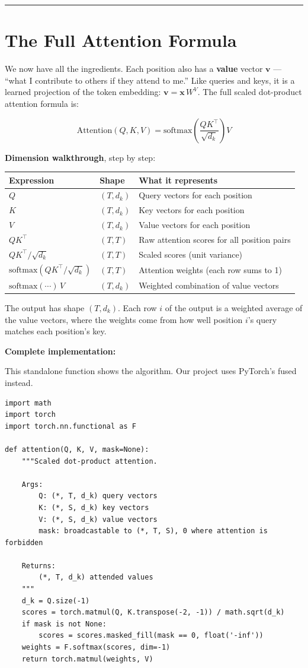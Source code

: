 \bigskip\hrule\bigskip

\section{The Full Attention Formula}

We now have all the ingredients. Each position also has a \textbf{value} vector $\mathbf{v}$ --- ``what I contribute to others if they attend to me.'' Like queries and keys, it is a learned projection of the token embedding: $\mathbf{v} = \mathbf{x}\, W^V$. The full scaled dot-product attention formula is:

\[
\mathrm{Attention}(Q, K, V) = \mathrm{softmax}\!\left(\frac{QK^\top}{\sqrt{d_k}}\right) V
\]

\textbf{Dimension walkthrough}, step by step:

\begin{tabular}{lll}
\toprule
Expression & Shape & What it represents \\
\midrule
$Q$ & $(T, d_k)$ & Query vectors for each position \\
$K$ & $(T, d_k)$ & Key vectors for each position \\
$V$ & $(T, d_k)$ & Value vectors for each position \\
$QK^\top$ & $(T, T)$ & Raw attention scores for all position pairs \\
$QK^\top / \sqrt{d_k}$ & $(T, T)$ & Scaled scores (unit variance) \\
$\mathrm{softmax}(QK^\top / \sqrt{d_k})$ & $(T, T)$ & Attention weights (each row sums to 1) \\
$\mathrm{softmax}(\cdots)\, V$ & $(T, d_k)$ & Weighted combination of value vectors \\
\bottomrule
\end{tabular}

The output has shape $(T, d_k)$. Each row $i$ of the output is a weighted average of the value vectors, where the weights come from how well position $i$'s query matches each position's key.

\textbf{Complete implementation:}

This standalone function shows the algorithm. Our project uses PyTorch's fused  instead.

\demotag
\begin{lstlisting}
import math
import torch
import torch.nn.functional as F

def attention(Q, K, V, mask=None):
    """Scaled dot-product attention.

    Args:
        Q: (*, T, d_k) query vectors
        K: (*, S, d_k) key vectors
        V: (*, S, d_k) value vectors
        mask: broadcastable to (*, T, S), 0 where attention is forbidden

    Returns:
        (*, T, d_k) attended values
    """
    d_k = Q.size(-1)
    scores = torch.matmul(Q, K.transpose(-2, -1)) / math.sqrt(d_k)
    if mask is not None:
        scores = scores.masked_fill(mask == 0, float('-inf'))
    weights = F.softmax(scores, dim=-1)
    return torch.matmul(weights, V)
\end{lstlisting}

